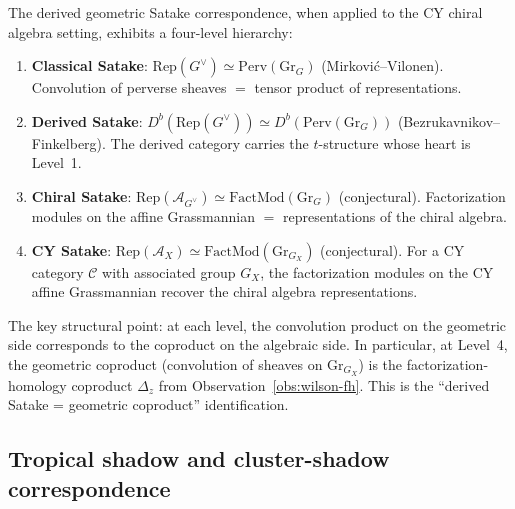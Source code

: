 \documentclass[11pt]{article}
\newcommand{\cA}{\mathcal{A}}
\newcommand{\cC}{\mathcal{C}}
\begin{document}
\begin{observation}
\label{obs:derived-satake}
The derived geometric Satake correspondence, when applied to the
CY chiral algebra setting, exhibits a four-level hierarchy:
\begin{enumerate}[label=\textup{Level \arabic*:}]
 \item \textbf{Classical Satake}: $\mathrm{Rep}(G^\vee) \simeq
 \mathrm{Perv}(\mathrm{Gr}_G)$ (Mirkovi\'c--Vilonen). Convolution
 of perverse sheaves $=$ tensor product of representations.
 \item \textbf{Derived Satake}: $D^b(\mathrm{Rep}(G^\vee)) \simeq
 D^b(\mathrm{Perv}(\mathrm{Gr}_G))$ (Bezrukavnikov--Finkelberg).
 The derived category carries the $t$-structure whose heart is
 Level~1.
 \item \textbf{Chiral Satake}: $\mathrm{Rep}(\cA_{G^\vee}) \simeq
 \mathrm{FactMod}(\mathrm{Gr}_G)$ (conjectural). Factorization
 modules on the affine Grassmannian $=$ representations of the
 chiral algebra.
 \item \textbf{CY Satake}: $\mathrm{Rep}(\cA_{X}) \simeq
 \mathrm{FactMod}(\mathrm{Gr}_{G_X})$ (conjectural). For a CY
 category $\cC$ with associated group $G_X$, the factorization
 modules on the CY affine Grassmannian recover the chiral algebra
 representations.
\end{enumerate}
The key structural point: at each level, the convolution product on
the geometric side corresponds to the coproduct on the algebraic side.
In particular, at Level~4, the geometric coproduct (convolution of
sheaves on $\mathrm{Gr}_{G_X}$) is the factorization-homology coproduct
$\Delta_z$ from Observation~\ref{obs:wilson-fh}. This is the ``derived
Satake = geometric coproduct'' identification.
\end{observation}

\subsection{Tropical shadow and cluster-shadow correspondence}
\label{subsec:tropical-shadow}
\end{document}
